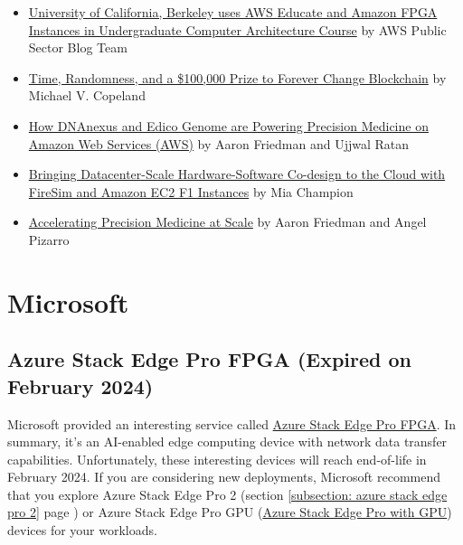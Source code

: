 \documentclass[a4paper]{article}
\begin{document}
    \begin{itemize}
        \item \href{https://aws.amazon.com/blogs/publicsector/university-of-berkeley-uses-aws-educate-for-amazon-fpga-accelerator-development-and-deployment-in-the-cloud/}{University of California, Berkeley uses AWS Educate and Amazon FPGA Instances in Undergraduate Computer Architecture Course} by AWS Public Sector Blog Team

        \item \href{https://aws.amazon.com/blogs/startups/competition-forever-change-blockchain/}{Time, Randomness, and a \$100,000 Prize to Forever Change Blockchain} by Michael V. Copeland

        \item \href{https://aws.amazon.com/blogs/apn/how-dnanexus-and-edico-genome-are-powering-precision-medicine-on-amazon-web-services-aws/}{How DNAnexus and Edico Genome are Powering Precision Medicine on Amazon Web Services (AWS)} by Aaron Friedman and Ujjwal Ratan

        \item \href{https://aws.amazon.com/blogs/compute/bringing-datacenter-scale-hardware-software-co-design-to-the-cloud-with-firesim-and-amazon-ec2-f1-instances/}{Bringing Datacenter-Scale Hardware-Software Co-design to the Cloud with FireSim and Amazon EC2 F1 Instances} by Mia Champion

        \item \href{https://aws.amazon.com/blogs/compute/accelerating-precision-medicine-at-scale/}{Accelerating Precision Medicine at Scale} by Aaron Friedman and Angel Pizarro
    \end{itemize}

    \newpage

    \section{Microsoft}

    \subsection{Azure Stack Edge Pro FPGA (Expired on February 2024)}

    Microsoft provided an interesting service called \href{https://learn.microsoft.com/en-us/azure/databox-online/azure-stack-edge-overview}{Azure Stack Edge Pro FPGA}. In summary, it's an AI-enabled edge computing device with network data transfer capabilities. Unfortunately, these interesting devices will reach end-of-life in February 2024. If you are considering new deployments, Microsoft recommend that you explore Azure Stack Edge Pro 2 (section \ref{subsection: azure stack edge pro 2} page \pageref{subsection: azure stack edge pro 2}) or Azure Stack Edge Pro GPU (\href{https://learn.microsoft.com/en-us/azure/databox-online/azure-stack-edge-gpu-overview}{Azure Stack Edge Pro with GPU}) devices for your workloads.\newline
\end{document}
